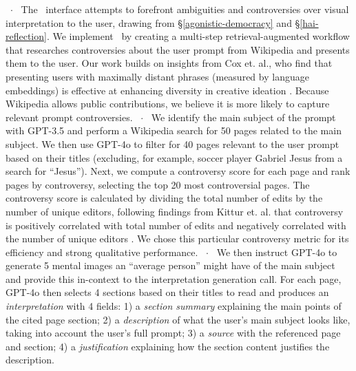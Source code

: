 \textbf{\agonisticbox}~$\cdot$~
The \agonistic~interface attempts to forefront ambiguities and controversies over visual interpretation to the user, drawing from \S\ref{agonistic-democracy} and \S\ref{hai-reflection}.
We implement \agonistic~by creating a multi-step retrieval-augmented workflow that researches controversies about the user prompt from Wikipedia and presents them to the user.
Our work builds on insights from Cox et. al., who find that presenting users with maximally distant phrases (measured by language embeddings) is effective at enhancing diversity in creative ideation \cite{coxetal2021directeddiversity}.
Because Wikipedia allows public contributions, we believe it is more likely to capture relevant prompt controversies.%
~$\cdot$~
We identify the main subject of the prompt with GPT-3.5 and perform a Wikipedia search for 50 pages related to the main subject. 
We then use GPT-4o to filter for 40 pages relevant to the user prompt based on their titles (excluding, for example, soccer player Gabriel Jesus from a search for ``Jesus'').
Next, we compute a controversy score for each page and rank pages by controversy, selecting the top 20 most controversial pages. 
The controversy score is calculated by dividing the total number of edits by the number of unique editors, following findings from Kittur et. al. that controversy is positively correlated with total number of edits and negatively correlated with the number of unique editors \cite{kitturetal2007conflictwikipedia}.
We chose this particular controversy metric for its efficiency and strong qualitative performance.
~$\cdot$~
We then instruct GPT-4o to generate 5 mental images an ``average person'' might have of the main subject and provide this in-context to the interpretation generation call.
For each page, GPT-4o then selects 4 sections based on their titles to read and produces an \textit{interpretation} with 4 fields: 1) a \textit{section summary} explaining the main points of the cited page section; 2) a \textit{description} of what the user's main subject looks like, taking into account the user's full prompt; 3) a \textit{source} with the referenced page and section; 4) a \textit{justification} explaining how the section content justifies the description.
